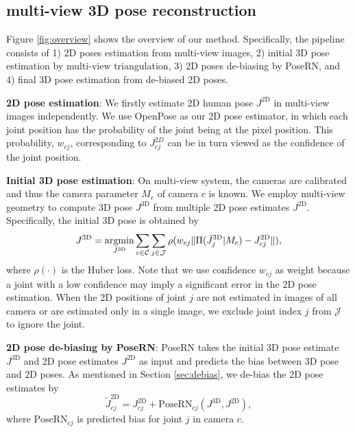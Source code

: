 \documentclass{article}
\newcommand{\argmin}{\mathop{\rm argmin}\limits}
\begin{document}
\vspace{-0.2cm}
\subsection{multi-view 3D pose reconstruction}
\label{sec:MV3Dpose}

Figure \ref{fig:overview} shows the overview of our method. Specifically, the pipeline consists of 1) 2D poses estimation from multi-view images, 2) 
initial 3D pose estimation by multi-view triangulation,
3) 2D poses de-biasing by PoseRN, and 4) final 3D pose estimation from de-biased 2D poses.

\textbf{2D pose estimation}:
We firstly estimate 2D human pose $J^\text{2D}$ in multi-view images independently. We use OpenPose \cite{cao2018openpose} as our 2D pose estimator, in which each joint position has the probability of the joint being at the pixel position. This probability, $w_{cj}$, corresponding to $J_{cj}^{2D}$ can be in turn viewed as the confidence of the joint position.  

\textbf{Initial 3D pose estimation}:
On multi-view system, the cameras are calibrated and thus the camera parameter $M_c$ of camera $c$ is known.  We employ multi-view geometry to compute 3D pose $J^\text{3D}$ from multiple 2D pose estimates $J^\text{2D}$. Specifically, the initial 3D pose is obtained by 
\begin{equation}
J^\text{3D} = \argmin_{\bar{J}^\text{3D}} \sum_{c \in \mathcal{C}} \sum_{j \in \mathcal{J}} \rho(w_{cj}\|\Pi(\bar{J}^\text{3D}_{j}|M_c) - J^\text{2D}_{cj}\|),
\label{equ:energy}
\end{equation}
where $\rho(\cdot)$ is the Huber loss. Note that we use confidence $w_{cj}$ as weight because a joint with a low confidence may imply a significant error in the 2D pose estimation. When the 2D positions of joint $j$ are not estimated in images of all camera or are estimated only in a single image, we exclude joint index $j$ from $\mathcal{J}$ to ignore the joint. 

\textbf{2D pose de-biasing by PoseRN}:
PoseRN takes the initial 3D pose estimate $J^\text{3D}$ and 2D pose estimates $J^\text{2D}$ as input and predicts the bias between 3D pose and 2D poses. As mentioned in Section \ref{sec:debias}, we de-bias the 2D pose estimates by
\begin{equation}
    \tilde{J}^\text{2D}_{cj} = J^\text{2D}_{cj} + \text{PoseRN}_{cj}(J^\text{3D},J^\text{2D}),
\end{equation}
where $\text{PoseRN}_{cj}$ is predicted bias for joint $j$ in camera $c$. 
\end{document}
